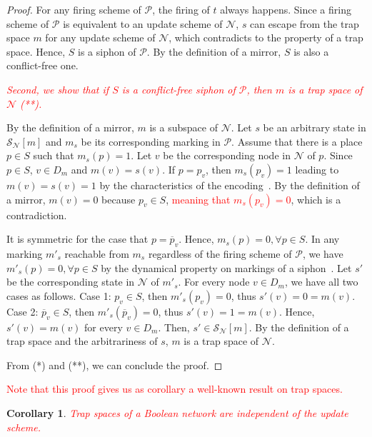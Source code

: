 \documentclass[preprint,12pt]{elsarticle}
\newtheorem{corollary}{Corollary}[section]
\newcommand{\change}[1]{\textcolor{red}{#1}}
\begin{document}
\begin{proof}
  For any firing scheme of \(\mathcal{P}\), the firing of \(t\) always happens.
  Since a firing scheme of \(\mathcal{P}\) is equivalent to an update scheme of \(\mathcal{N}\), \(s\) can escape from the trap space \(m\) for any update scheme of \(\mathcal{N}\), which contradicts to the property of a trap space.
  Hence, \(S\) is a siphon of \(\mathcal{P}\).
  By the definition of a mirror, \(S\) is also a conflict-free one.

  \change{\textit{Second, we show that if \(S\) is a conflict-free siphon of \(\mathcal{P}\), then \(m\) is a trap space of \(\mathcal{N}\) (**).}}

  By the definition of a mirror, \(m\) is a subspace of \(\mathcal{N}\).
  Let \(s\) be an arbitrary state in \(\mathcal{S}_{\mathcal{N}}[m]\) and \(m_s\) be its corresponding marking in \(\mathcal{P}\).
  Assume that there is a place \(p \in S\) such that \(m_s(p) = 1\).
  Let \(v\) be the corresponding node in \(\mathcal{N}\) of \(p\).
  Since \(p \in S\), \(v \in D_m\) and \(m(v) = s(v)\).
  If \(p = p_{v}\), then \(m_s(p_{v}) = 1\) leading to \(m(v) = s(v) = 1\) by the characteristics of the encoding~\cite{chaouiya2004qualitative}.
  By the definition of a mirror, \(m(v) = 0\) because \(p_{v} \in S\), \change{meaning that \(m_s(p_{v}) = 0\)}, which is a contradiction.

  It is symmetric for the case that \(p = \overline{p}_{v}\).
  Hence, \(m_s(p) = 0, \forall p \in S\).
  In any marking \(m'_s\) reachable from \(m_s\) regardless of the firing scheme of \(\mathcal{P}\), we have \(m'_s(p) = 0, \forall p \in S\) by the dynamical property on markings of a siphon~\cite{DBLP:journals/isci/LiuB16}.
  Let \(s'\) be the corresponding state in \(\mathcal{N}\) of \(m'_s\).
  For every node \(v \in D_m\), we have all two cases as follows.
  Case 1: \(p_v \in S\), then \(m'_s(p_v) = 0\), thus \(s'(v) = 0 = m(v)\).
  Case 2: \(\overline{p}_v \in S\), then \(m'_s(\overline{p}_v) = 0\), thus \(s'(v) = 1 = m(v)\).
  Hence, \(s'(v) = m(v)\) for every \(v \in D_m\).
  Then, \(s' \in \mathcal{S}_{\mathcal{N}}[m]\).
  By the definition of a trap space and the arbitrariness of \(s\), \(m\) is a trap space of \(\mathcal{N}\).

  From (*) and (**), we can conclude the proof.
\end{proof}

\change{Note that this proof gives us as corollary a well-known result on trap spaces.}

\begin{corollary}\label{cor:indep}
  \change{Trap spaces of a Boolean network are independent of the update scheme.}
\end{corollary}
\end{document}
